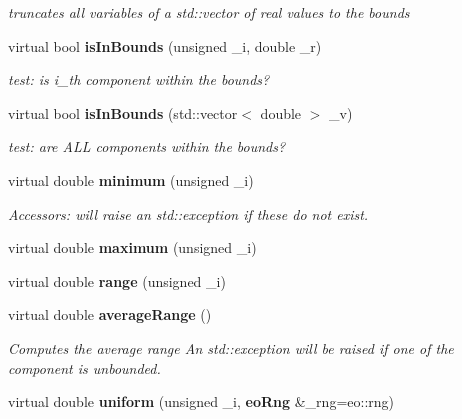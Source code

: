 \begin{CompactItemize}
\begin{CompactList}\small\item\em truncates all variables of a std::vector of real values to the bounds \item\end{CompactList}\item 
virtual bool {\bf is\-In\-Bounds} (unsigned \_\-i, double \_\-r)\label{classeo_real_base_vector_bounds_a14}

\begin{CompactList}\small\item\em test: is i\_\-th component within the bounds? \item\end{CompactList}\item 
virtual bool {\bf is\-In\-Bounds} (std::vector$<$ double $>$ \_\-v)\label{classeo_real_base_vector_bounds_a15}

\begin{CompactList}\small\item\em test: are ALL components within the bounds? \item\end{CompactList}\item 
virtual double {\bf minimum} (unsigned \_\-i)\label{classeo_real_base_vector_bounds_a16}

\begin{CompactList}\small\item\em Accessors: will raise an std::exception if these do not exist. \item\end{CompactList}\item 
virtual double {\bf maximum} (unsigned \_\-i)\label{classeo_real_base_vector_bounds_a17}

\item 
virtual double {\bf range} (unsigned \_\-i)\label{classeo_real_base_vector_bounds_a18}

\item 
virtual double {\bf average\-Range} ()\label{classeo_real_base_vector_bounds_a19}

\begin{CompactList}\small\item\em Computes the average range An std::exception will be raised if one of the component is unbounded. \item\end{CompactList}\item 
virtual double {\bf uniform} (unsigned \_\-i, {\bf eo\-Rng} \&\_\-rng=eo::rng)\label{classeo_real_base_vector_bounds_a20}


\end{CompactItemize}
